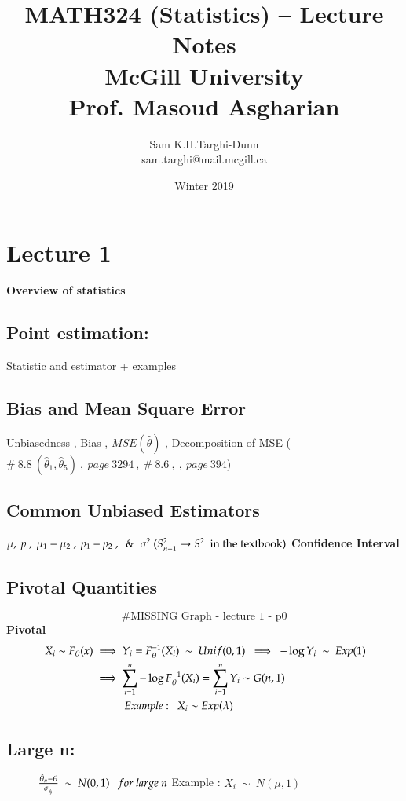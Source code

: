 \documentclass[14pt,twoside,a4paper,fleqn]{article}
\title{MATH324 (Statistics) -- Lecture Notes\\McGill University\\Prof. Masoud Asgharian}
\date{Winter 2019}
\author{Sam K.H.Targhi-Dunn\\sam.targhi@mail.mcgill.ca}
\theoremstyle{plain}
\begin{document}
\maketitle

\newcommand\tab[1][1cm]{\hspace*{#1}}

\tableofcontents
\newpage
\section{Lecture 1}
\textbf{Overview of statistics}
\subsection*{Point estimation: } Statistic and estimator + examples
\subsection*{Bias and Mean Square Error}
	Unbiasedness , Bias , $MSE(\hat{\theta})$ , Decomposition of MSE ($\#\ 8.8\ (\hat{\theta}_1,\hat{\theta}_5) \ , \ page\ 3294\ ,\ \#\ 8.6\ ,\ ,\ page\ 394$)
\subsection*{Common Unbiased Estimators}
$\mu ,\ p\ , \ \mu_1-\mu_2\ , \ p_1-p_2\ ,\ \And \sigma^2\ (S^{2}_{n-1}\to S^2\ \text{\ in the textbook})$
\textbf{Confidence Interval}
\subsection*{Pivotal Quantities}
$$
	\text{\#MISSING Graph - lecture 1 - p0}
$$
\textbf{Pivotal} 
\begin{equation*}
\begin{split}
\ X_i\sim F_{\theta}(x) &\implies Y_i = F^{-1}_{\theta}(X_i)\ \sim\ Unif(0,1) \ \implies\ -\log{Y_i}\ \sim\ Exp(1)\\
	&\implies \sum\limits_{i=1}^n -\log{F_{\theta}^{-1}(X_i)} = \sum\limits_{i=1}^n Y_i \sim G(n,1)\\
	&\tab Example:\ \ X_i\sim Exp(\lambda)
\end{split}
\end{equation*}
\subsection*{Large n: } $\tab\frac{\hat{\theta}_n - \theta}{\sigma_{_{\hat{\theta}}}} \ \sim \ N(0,1)\ \ \ for\ large\ n$
\tab Example : $X_i \ \sim \ N(\mu,1)$
\end{document}

